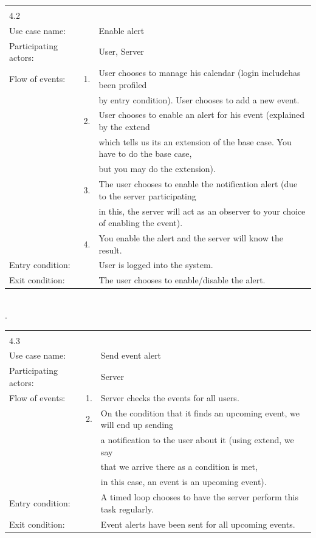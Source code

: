 \documentclass{article}
\begin{document}
\begin{tabular}{l r @{} l}
	\multicolumn{2}{c}{} \\
	4.2&&\\
	\hline
	Use case name:	&&Enable alert\\
	\hline
	Participating actors:&&User, Server \\
	\hline
	Flow of events:	&1.&User chooses to manage his calendar (login \flqq include\frqq has been profiled\\
				&&by entry condition). User chooses to add a new event.\\
				&2.&User chooses to enable an alert for his event (explained by the \flqq extend\frqq\\
					&& which tells us its an extension of the base case. You have to do the base case,\\
					&& but you may do the extension).\\
				&3.&The user chooses to enable the notification alert (due to the server participating\\
					&& in this, the server will act as an observer to your choice of enabling the event).\\
				&4.&You enable the alert and the server will know the result.\\
	\hline
	Entry condition:	&&User is logged into the system.\\
	\hline
	Exit condition:	&&The user chooses to enable/disable the alert.\\
	\hline
\end{tabular}
	\\
	.\\
\begin{tabular}{l r @{} l}
	\multicolumn{2}{c}{} \\
	4.3&&\\
	\hline
	Use case name:	&&Send event alert\\
	\hline
	Participating actors:&&Server\\
	\hline
	Flow of events:	&1.&Server checks the events for all users.\\
				&2.&On the condition that it finds an upcoming event, we will end up sending\\
					&&a notification to the user about it (using \flqq extend\frqq, we say\\
					&&that we arrive there as a condition is met,\\
					&&in this case, an event is an upcoming event).\\
	\hline
	Entry condition:	&&A timed loop chooses to have the server perform this task regularly.\\
	\hline
	Exit condition:	&&Event alerts have been sent for all upcoming events.\\
	\hline
\end{tabular}
\end{document}
